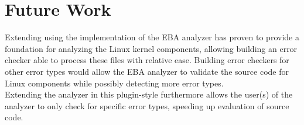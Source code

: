 \section{Future Work}

\noindent Extending using the implementation of the EBA analyzer has proven to provide a foundation for analyzing the Linux kernel components, allowing building an error checker able to process these files with relative ease. 
Building error checkers for other error types would allow the EBA analyzer to validate the source code for Linux components while possibly detecting more error types. \\

\noindent Extending the analyzer in this plugin-style furthermore allows the user(s) of the analyzer to only check for specific error types, speeding up evaluation of source code.

